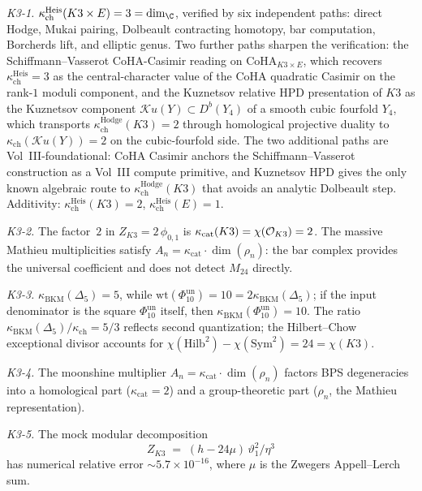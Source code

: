 \emph{K3-1.}
$\kappa_{\mathrm{ch}}^{\mathrm{Heis}}(K3 \times E) = 3 = \dim_\C$, verified
by six independent paths: direct Hodge, Mukai pairing,
Dolbeault contracting homotopy, bar computation, Borcherds
lift, and elliptic genus. Two further paths sharpen the verification:
the Schiffmann--Vasserot CoHA-Casimir reading on
$\mathrm{CoHA}_{K3\times E}$, which recovers
$\kappa_{\mathrm{ch}}^{\mathrm{Heis}} = 3$ as the central-character value of the
CoHA quadratic Casimir on the rank-$1$ moduli component, and the
Kuznetsov relative HPD presentation of $K3$ as the Kuznetsov
component $\mathcal{K}u(Y) \subset D^b(Y_4)$ of a smooth cubic
fourfold $Y_4$, which transports $\kappa_{\mathrm{ch}}^{\mathrm{Hodge}}(K3) = 2$
through homological projective duality to
$\kappa_{\mathrm{ch}}(\mathcal{K}u(Y)) = 2$ on the cubic-fourfold
side. The two additional paths are Vol~III-foundational: CoHA Casimir
anchors the Schiffmann--Vasserot construction as a Vol~III compute
primitive, and Kuznetsov HPD gives the only known algebraic route to
$\kappa_{\mathrm{ch}}^{\mathrm{Hodge}}(K3)$ that avoids an analytic Dolbeault step.
Additivity: $\kappa_{\mathrm{ch}}^{\mathrm{Heis}}(K3) = 2$,
$\kappa_{\mathrm{ch}}^{\mathrm{Heis}}(E) = 1$.

\emph{K3-2.} The factor~$2$ in $Z_{K3} = 2\,\phi_{0,1}$ is
$\kappa_{\mathrm{cat}}(K3) = \chi(\mathcal{O}_{K3}) = 2$. The massive
Mathieu multiplicities satisfy
$A_n = \kappa_{\mathrm{cat}} \cdot \dim(\rho_n)$: the bar
complex provides the universal coefficient and does not detect
$M_{24}$ directly.

\emph{K3-3.}
$\kappa_{\mathrm{BKM}}(\Delta_5)=5$, while
$\mathrm{wt}(\Phi_{10}^{\mathrm{un}})=10=2\kappa_{\mathrm{BKM}}(\Delta_5)$;
if the input denominator is the square $\Phi_{10}^{\mathrm{un}}$ itself,
then $\kappa_{\mathrm{BKM}}(\Phi_{10}^{\mathrm{un}})=10$.
The ratio
$\kappa_{\mathrm{BKM}}(\Delta_5)/\kappa_{\mathrm{ch}} = 5/3$ reflects
second quantization; the Hilbert--Chow exceptional divisor
accounts for
$\chi(\mathrm{Hilb}^2) - \chi(\mathrm{Sym}^2) = 24 = \chi(K3)$.

\emph{K3-4.} The moonshine multiplier
$A_n = \kappa_{\mathrm{cat}} \cdot \dim(\rho_n)$ factors BPS
degeneracies into a homological part
($\kappa_{\mathrm{cat}} = 2$) and a group-theoretic part
($\rho_n$, the Mathieu representation).

\emph{K3-5.} The mock modular decomposition
\[
 Z_{K3} \;=\; (h - 24\mu)\,\vartheta_1^2 / \eta^3
\]
has numerical relative error
\({\sim}5.7 \times 10^{-16}\), where $\mu$ is
the Zwegers Appell--Lerch sum.

